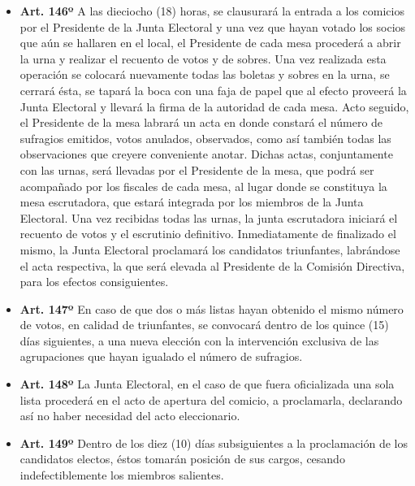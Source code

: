 \documentclass[openany]{book}
\providecommand{\tightlist}{%
  \setlength{\itemsep}{0pt}\setlength{\parskip}{0pt}}
\begin{document}
\begin{itemize}
\tightlist
\item
  \textbf{Art. 146º}
  A las dieciocho (18) horas, se clausurará la entrada a los comicios por el Presidente de la Junta Electoral y una vez que hayan votado los socios que aún se hallaren en el local, el Presidente de cada mesa procederá a abrir la urna y realizar el recuento de votos y de sobres. Una vez realizada esta operación se colocará nuevamente todas las boletas y sobres en la urna, se cerrará ésta, se tapará la boca con una faja de papel que al efecto proveerá la Junta Electoral y llevará la firma de la autoridad de cada mesa. Acto seguido, el Presidente de la mesa labrará un acta en donde constará el número de sufragios emitidos, votos anulados, observados, como así también todas las observaciones que creyere conveniente anotar. Dichas actas, conjuntamente con las urnas, será llevadas por el Presidente de la mesa, que podrá ser acompañado por los fiscales de cada mesa, al lugar donde se constituya la mesa escrutadora, que estará integrada por los miembros de la Junta Electoral. Una vez recibidas todas las urnas, la junta escrutadora iniciará el recuento de votos y el escrutinio definitivo. Inmediatamente de finalizado el mismo, la Junta Electoral proclamará los candidatos triunfantes, labrándose el acta respectiva, la que será elevada al Presidente de la Comisión Directiva, para los efectos consiguientes.
\end{itemize}

\begin{itemize}
\tightlist
\item
  \textbf{Art. 147º}
  En caso de que dos o más listas hayan obtenido el mismo número de votos, en calidad de triunfantes, se convocará dentro de los quince (15) días siguientes, a una nueva elección con la intervención exclusiva de las agrupaciones que hayan igualado el número de sufragios.
\end{itemize}

\begin{itemize}
\tightlist
\item
  \textbf{Art. 148º}
  La Junta Electoral, en el caso de que fuera oficializada una sola lista procederá en el acto de apertura del comicio, a proclamarla, declarando así no haber necesidad del acto eleccionario.
\end{itemize}

\begin{itemize}
\tightlist
\item
  \textbf{Art. 149º}
  Dentro de los diez (10) días subsiguientes a la proclamación de los candidatos electos, éstos tomarán posición de sus cargos, cesando indefectiblemente los miembros salientes.
\end{itemize}
\end{document}
